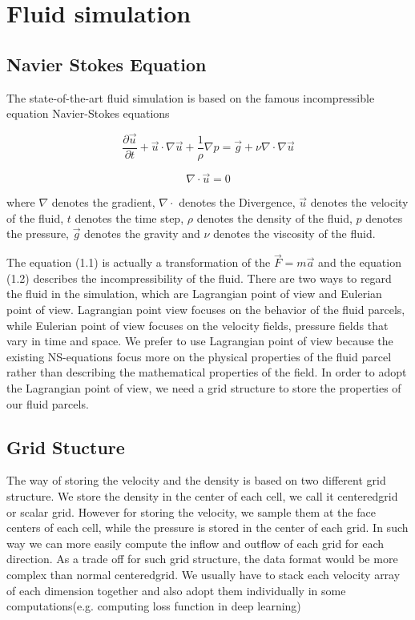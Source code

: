 \documentclass[a4paper,12pt,twoside]{report}
\begin{document}
\section{Fluid simulation}
\subsection{Navier Stokes Equation}
The state-of-the-art fluid simulation is based on the famous incompressible equation Navier-Stokes equations

\begin{equation}
\frac{\partial \vec u}{\partial t}+\vec u\cdot \nabla\vec u+\frac1\rho\nabla p = \vec g + \nu\nabla\cdot\nabla\vec{u}
\end{equation}

\begin{equation}
{\nabla}\cdot\vec{u} = 0
\end{equation}

where $\nabla$ denotes the gradient, $\nabla\cdot$ denotes the Divergence, $\vec{u}$ denotes the velocity of the fluid, $t$ denotes the time step, $\rho$ denotes the density of the fluid, $p$ denotes the pressure, $\vec{g}$ denotes the gravity and $\nu$ denotes the viscosity of the fluid.

The equation (1.1) is actually a transformation of the $\vec{F} = m\vec{a}$ and the equation (1.2) describes the incompressibility of the fluid. There are two ways to regard the fluid in the simulation, which are Lagrangian point of view and Eulerian point of  view. Lagrangian point view focuses on the behavior of the fluid parcels, while Eulerian point of view focuses on the velocity fields, pressure fields that vary in time and space. We prefer to use Lagrangian point of view because the existing NS-equations focus more on the physical properties of the fluid parcel rather than describing the mathematical properties of the field.  In order to adopt the Lagrangian point of view, we need a grid structure to store the properties of our fluid parcels.

\subsection{Grid Stucture}
The way of storing the velocity and the density is based on two different grid structure. We store the density in the center of each cell, we call it centeredgrid or scalar grid. However for storing the velocity, we sample them at the face centers of each cell\cite{doi:10.1063/1.1761178}, while the pressure is stored in the center of each grid. In such way we can more easily compute the inflow and outflow of each grid for each direction. As a trade off for such grid structure, the data format would be more complex than normal centeredgrid. We usually have to stack each velocity array of each dimension together and also adopt them individually in some computations(e.g. computing loss function in deep learning)
\end{document}
